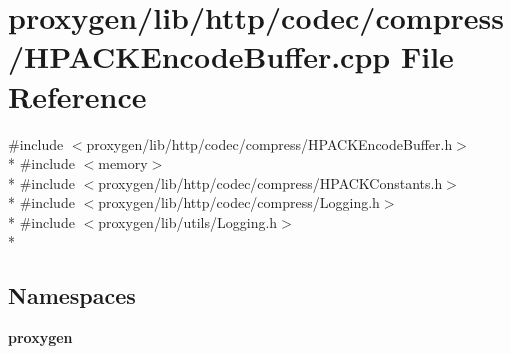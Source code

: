 \section{proxygen/lib/http/codec/compress/\+H\+P\+A\+C\+K\+Encode\+Buffer.cpp File Reference}
\label{HPACKEncodeBuffer_8cpp}
{\ttfamily \#include $<$proxygen/lib/http/codec/compress/\+H\+P\+A\+C\+K\+Encode\+Buffer.\+h$>$}\\*
{\ttfamily \#include $<$memory$>$}\\*
{\ttfamily \#include $<$proxygen/lib/http/codec/compress/\+H\+P\+A\+C\+K\+Constants.\+h$>$}\\*
{\ttfamily \#include $<$proxygen/lib/http/codec/compress/\+Logging.\+h$>$}\\*
{\ttfamily \#include $<$proxygen/lib/utils/\+Logging.\+h$>$}\\*
\subsection*{Namespaces}
\begin{DoxyCompactItemize}
\item 
 {\bf proxygen}
\end{DoxyCompactItemize}
